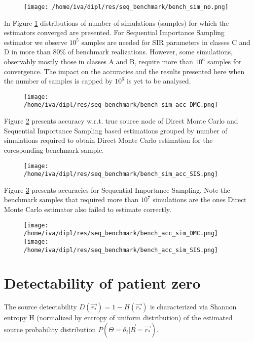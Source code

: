 \documentclass[times, utf8, diplomski]{fer}
\begin{document}
\begin{figure}[H]
\texttt{[image: /home/iva/dipl/res/seq\_benchmark/bench\_sim\_no.png]}
\caption{}
\label{bench_sim_no}
\end{figure}
In Figure \ref{bench_sim_no} distributions of number of simulations (samples) for which the estimators converged are presented. For Sequential Importance Sampling estimator we observe $10^5$ samples are needed for SIR parameters in classes C and D in more than $80\%$ of benchmark realizations. However, some simulations, observably mostly those in classes A and B, require more than $10^6$ samples for convergence. The impact on the accuracies and the results presented here when the number of samples is capped by $10^6$ is yet to be analysed. 

\begin{figure}[H]
\texttt{[image: /home/iva/dipl/res/seq\_benchmark/bench\_sim\_acc\_DMC.png]}
\caption{}
\label{bench_sim_accDMC}
\end{figure}
Figure \ref{bench_sim_accDMC} presents accuracy w.r.t. true source node of Direct Monte Carlo and Sequential Importance Sampling based estimations grouped by number of simulations required to obtain Direct Monte Carlo estimation for the coresponding benchmark sample. 
	
\begin{figure}[H]
\texttt{[image: /home/iva/dipl/res/seq\_benchmark/bench\_sim\_acc\_SIS.png]}
\caption{}
\label{bench_sim_accSIS}
\end{figure}
Figure \ref{bench_sim_accSIS} presents accuracies for Sequential Importance Sampling. Note the benchmark samples that required more than $10^7$ simulations are the ones Direct Monte Carlo estimator also failed to estimate correctly.  

\begin{figure}[H]
\texttt{[image: /home/iva/dipl/res/seq\_benchmark/bench\_acc\_sim\_DMC.png]}
\texttt{[image: /home/iva/dipl/res/seq\_benchmark/bench\_acc\_sim\_SIS.png]}
\caption{}
\label{bench_acc_simDMC}
\end{figure}




\chapter{Detectability of patient zero} 

The source detectability $D(\vec{r_*}) = 1 - H(\vec{r_*})$ is characterized via Shannon entropy H (normalized by entropy of uniform distribution) of the estimated source probability distribution $P(\Theta = \theta_i |\vec{R} = \vec{r_*}).$
\end{document}
